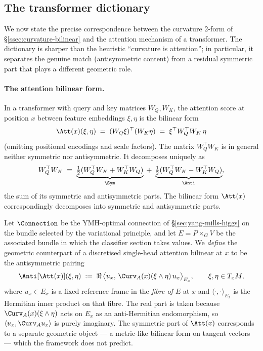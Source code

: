 \subsection{The transformer dictionary}\label{ssec:transformer-dictionary}

We now state the precise correspondence between the curvature 2-form
of \S\ref{ssec:curvature-bilinear} and the attention mechanism of a
transformer. The dictionary is sharper than the heuristic
``curvature is attention''; in particular, it separates the genuine
match (antisymmetric content) from a residual symmetric part that
plays a different geometric role.

\paragraph{The attention bilinear form.} In a transformer with
query and key matrices $W_Q,W_K$, the attention score at position $x$
between feature embeddings $\xi,\eta$ is the bilinear form
\[
   \Att(x)(\xi,\eta) \;=\; (W_Q\xi)^\top(W_K\eta)
   \;=\; \xi^\top W_Q^\top W_K\,\eta
\]
(omitting positional encodings and scale factors). The matrix
$W_Q^\top W_K$ is in general neither symmetric nor antisymmetric. It
decomposes uniquely as
\[
   W_Q^\top W_K \;=\;
   \underbrace{\tfrac12(W_Q^\top W_K + W_K^\top W_Q)}_{\Sym}
   \;+\;
   \underbrace{\tfrac12(W_Q^\top W_K - W_K^\top W_Q)}_{\Anti},
\]
the sum of its symmetric and antisymmetric parts. The bilinear form
$\Att(x)$ correspondingly decomposes into symmetric and antisymmetric
parts.

\begin{definition}\label{thm:attention}
Let $\Connection$ be the YMH-optimal connection of
\S\ref{sec:yang-mills-higgs} on the bundle selected by the
variational principle, and let $E=P\times_G V$ be the associated
bundle in which the classifier section takes values. We
\emph{define} the geometric counterpart of a discretised single-head
attention bilinear at $x$ to be the antisymmetric pairing
\[
   \Anti[\Att(x)](\xi,\eta) \;:=\;
   \Re\,\bigl\langle u_x,\,\Curv_A(x)(\xi\wedge\eta)\,u_x\bigr\rangle_{E_x},
   \qquad \xi,\eta\in T_xM,
\]
where $u_x\in E_x$ is a fixed reference frame in the \emph{fibre of
$E$} at $x$ and $\langle\cdot,\cdot\rangle_{E_x}$ is the Hermitian
inner product on that fibre. The real part is taken because
$\Curv_A(x)(\xi\wedge\eta)$ acts on $E_x$ as an anti-Hermitian
endomorphism, so $\langle u_x,\Curv_A u_x\rangle$ is purely
imaginary. The symmetric part of $\Att(x)$ corresponds to a separate
geometric object --- a metric-like bilinear form on tangent vectors
--- which the framework does not predict.
\end{definition}


